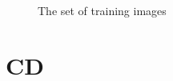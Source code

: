 \documentclass[pdftex,a4paper,12pt,twoside]{report}
\theoremstyle{plain} \newtheorem{theorem}{Theorem} \newtheorem{proposition}{Proposition} \newtheorem{lemma}{Lemma} \newtheorem*{corollary}{Corollary}
\theoremstyle{definition} \newtheorem{definition}{Definition} \newtheorem{conjecture}{Conjecture} \newtheorem*{example}{Example} \newtheorem{algorithm}{Algorithm}
\theoremstyle{remark} \newtheorem*{remark}{Remark} \newtheorem*{note}{Note} \newtheorem{case}{Case}
\begin{document}
\begin{figure}
\begin{subfigure}[b]{40px}
	\end{subfigure}
\caption{The set of training images}
\label{fig:trainingImages}
\end{figure}

\cleardoublepage


%
%
\cleardoublepage

\listoffigures

\cleardoublepage
\lstlistoflistings
%

\cleardoublepage
\chapter{CD}
\label{ch:cd}
\end{document}
